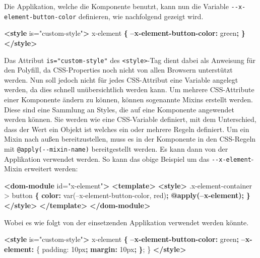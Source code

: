 \documentclass[]{article}
\newenvironment{Shaded}{}{}
\newcommand{\KeywordTok}[1]{\textcolor[rgb]{0.00,0.44,0.13}{\textbf{{#1}}}}
\newcommand{\DataTypeTok}[1]{\textcolor[rgb]{0.56,0.13,0.00}{{#1}}}
\newcommand{\FloatTok}[1]{\textcolor[rgb]{0.25,0.63,0.44}{{#1}}}
\newcommand{\StringTok}[1]{\textcolor[rgb]{0.25,0.44,0.63}{{#1}}}
\newcommand{\OtherTok}[1]{\textcolor[rgb]{0.00,0.44,0.13}{{#1}}}
\newcommand{\ErrorTok}[1]{\textcolor[rgb]{1.00,0.00,0.00}{\textbf{{#1}}}}
\newcommand{\NormalTok}[1]{{#1}}
\begin{document}
Die Applikation, welche die Komponente benutzt, kann nun die Variable
\texttt{-\/-x-element-button-color} definieren, wie nachfolgend gezeigt
wird.

\begin{Shaded}
\begin{Highlighting}[]
\KeywordTok{<style}\OtherTok{ is=}\StringTok{"custom-style"}\KeywordTok{>}
  \NormalTok{x-element }\KeywordTok{\{}
    \KeywordTok{--x-element-button-color:} \DataTypeTok{green}\KeywordTok{;}
  \KeywordTok{\}}
\KeywordTok{</style>}
\end{Highlighting}
\end{Shaded}

Das Attribut \texttt{is="custom-style"} des
\texttt{\textless{}style\textgreater{}}-Tag dient dabei als Anweisung
für den Polyfill, da CSS-Properties noch nicht von allen Browsern
unterstützt werden. Nun soll jedoch nicht für jedes CSS-Attribut eine
Variable angelegt werden, da dies schnell unübersichtlich werden kann.
Um mehrere CSS-Attribute einer Komponente ändern zu können, können
sogenannte Mixins erstellt werden. Diese sind eine Sammlung an Styles,
die auf eine Komponente angewendet werden können. Sie werden wie eine
CSS-Variable definiert, mit dem Unterschied, dass der Wert ein Objekt
ist welches ein oder mehrere Regeln definiert. Um ein Mixin nach außen
bereitzustellen, muss es in der Komponente in den CSS-Regeln mit
\texttt{@apply(-\/-mixin-name)} bereitgestellt werden. Es kann dann von
der Applikation verwendet werden. So kann das obige Beispiel um das
\texttt{-\/-x-element}-Mixin erweitert werden:

\begin{Shaded}
\begin{Highlighting}[]
\KeywordTok{<dom-module}\OtherTok{ id=}\StringTok{"x-element"}\KeywordTok{>}
  \KeywordTok{<template>}
    \KeywordTok{<style>}
      \FloatTok{.x-element-container} \NormalTok{> button }\KeywordTok{\{}
        \KeywordTok{color:} \NormalTok{var(--x-element-button-color, }\DataTypeTok{red}\NormalTok{)}\KeywordTok{;}
        \ErrorTok{@apply(--x-element);}
      \KeywordTok{\}}
    \KeywordTok{</style>} 
  \KeywordTok{</template>}
\KeywordTok{</dom-module>}
\end{Highlighting}
\end{Shaded}

Wobei es wie folgt von der einsetzenden Applikation verwendet werden
könnte.

\begin{Shaded}
\begin{Highlighting}[]
\KeywordTok{<style}\OtherTok{ is=}\StringTok{"custom-style"}\KeywordTok{>}
  \NormalTok{x-element }\KeywordTok{\{}
    \KeywordTok{--x-element-button-color:} \DataTypeTok{green}\KeywordTok{;}
    \KeywordTok{--x-element:} \NormalTok{\{}
        \NormalTok{padding: }\DataTypeTok{10px}\KeywordTok{;}
        \KeywordTok{margin:} \DataTypeTok{10px}\KeywordTok{;}
    \KeywordTok{\}}\NormalTok{;}
  \NormalTok{\}}
\KeywordTok{</style>}
\end{Highlighting}
\end{Shaded}
\end{document}

